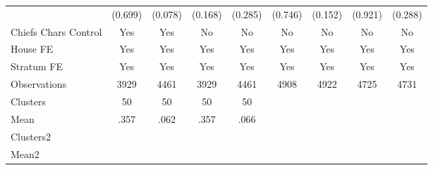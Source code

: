 {\begin{tabular}{l*{8}{c}}
                &  (0.699)         &  (0.078)         &  (0.168)         &  (0.285)         &  (0.746)         &  (0.152)         &  (0.921)         &  (0.288)         \\
Chiefs Chars Control &      Yes         &      Yes         &       No         &       No         &       No         &       No         &       No         &       No         \\
House FE        &      Yes         &      Yes         &      Yes         &      Yes         &      Yes         &      Yes         &      Yes         &      Yes         \\
Stratum FE      &      Yes         &      Yes         &      Yes         &      Yes         &      Yes         &      Yes         &      Yes         &      Yes         \\
\midrule
Observations    &     3929         &     4461         &     3929         &     4461         &     4908         &     4922         &     4725         &     4731         \\
Clusters        &       50         &       50         &       50         &       50         &                  &                  &                  &                  \\
Mean            &     .357         &     .062         &     .357         &     .066         &                  &                  &                  &                  \\
Clusters2       &                  &                  &                  &                  &                  &                  &                  &                  \\
Mean2           &                  &                  &                  &                  &                  &                  &                  &                  \\
\bottomrule
\end{tabular}
}

